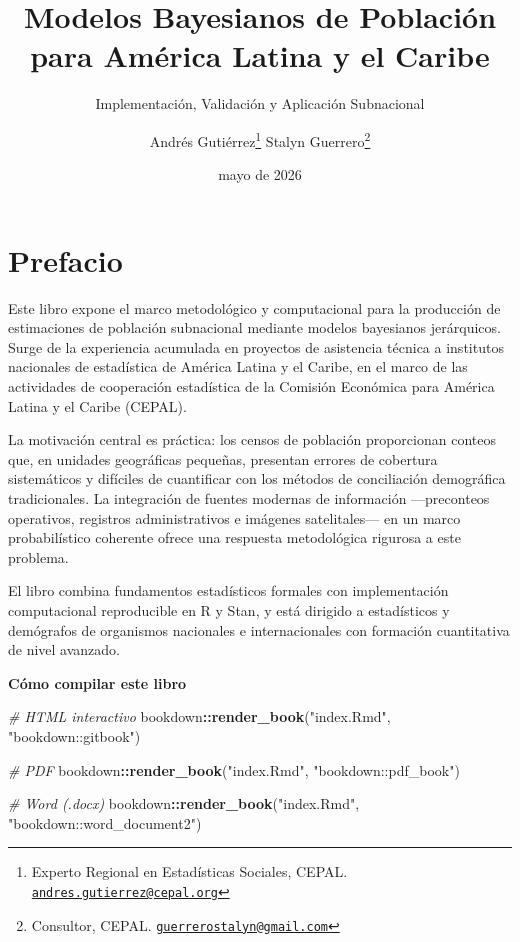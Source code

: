 \documentclass[
  spanish,
]{book}
\title{Modelos Bayesianos de Población para América Latina y el Caribe}
\subtitle{Implementación, Validación y Aplicación Subnacional}
\author{Andrés Gutiérrez\footnote{Experto Regional en Estadísticas Sociales, CEPAL. \href{mailto:andres.gutierrez@cepal.org}{\nolinkurl{andres.gutierrez@cepal.org}}}
Stalyn Guerrero\footnote{Consultor, CEPAL. \href{mailto:guerrerostalyn@gmail.com}{\nolinkurl{guerrerostalyn@gmail.com}}}}
\date{mayo de 2026}
\newenvironment{Shaded}{\begin{snugshade}}{\end{snugshade}}
\newcommand{\CommentTok}[1]{\textcolor[rgb]{0.56,0.35,0.01}{\textit{#1}}}
\newcommand{\FunctionTok}[1]{\textcolor[rgb]{0.13,0.29,0.53}{\textbf{#1}}}
\newcommand{\NormalTok}[1]{#1}
\newcommand{\SpecialCharTok}[1]{\textcolor[rgb]{0.81,0.36,0.00}{\textbf{#1}}}
\newcommand{\StringTok}[1]{\textcolor[rgb]{0.31,0.60,0.02}{#1}}
\begin{document}
\maketitle

{
\setcounter{tocdepth}{2}
\tableofcontents
}
\listoffigures
\listoftables
\chapter*{Prefacio}\label{prefacio}

Este libro expone el marco metodológico y computacional para la producción de estimaciones
de población subnacional mediante modelos bayesianos jerárquicos. Surge de la experiencia
acumulada en proyectos de asistencia técnica a institutos nacionales de estadística de
América Latina y el Caribe, en el marco de las actividades de cooperación estadística de la
Comisión Económica para América Latina y el Caribe (CEPAL).

La motivación central es práctica: los censos de población proporcionan conteos que, en
unidades geográficas pequeñas, presentan errores de cobertura sistemáticos y difíciles de
cuantificar con los métodos de conciliación demográfica tradicionales. La integración de
fuentes modernas de información ---preconteos operativos, registros administrativos e
imágenes satelitales--- en un marco probabilístico coherente ofrece una respuesta
metodológica rigurosa a este problema.

El libro combina fundamentos estadísticos formales con implementación computacional
reproducible en R y Stan, y está dirigido a estadísticos y demógrafos de organismos
nacionales e internacionales con formación cuantitativa de nivel avanzado.

\textbf{Cómo compilar este libro}

\begin{Shaded}
\begin{Highlighting}[]
\CommentTok{\# HTML interactivo}
\NormalTok{bookdown}\SpecialCharTok{::}\FunctionTok{render\_book}\NormalTok{(}\StringTok{"index.Rmd"}\NormalTok{, }\StringTok{"bookdown::gitbook"}\NormalTok{)}

\CommentTok{\# PDF}
\NormalTok{bookdown}\SpecialCharTok{::}\FunctionTok{render\_book}\NormalTok{(}\StringTok{"index.Rmd"}\NormalTok{, }\StringTok{"bookdown::pdf\_book"}\NormalTok{)}

\CommentTok{\# Word (.docx)}
\NormalTok{bookdown}\SpecialCharTok{::}\FunctionTok{render\_book}\NormalTok{(}\StringTok{"index.Rmd"}\NormalTok{, }\StringTok{"bookdown::word\_document2"}\NormalTok{)}
\end{Highlighting}
\end{Shaded}
\end{document}
